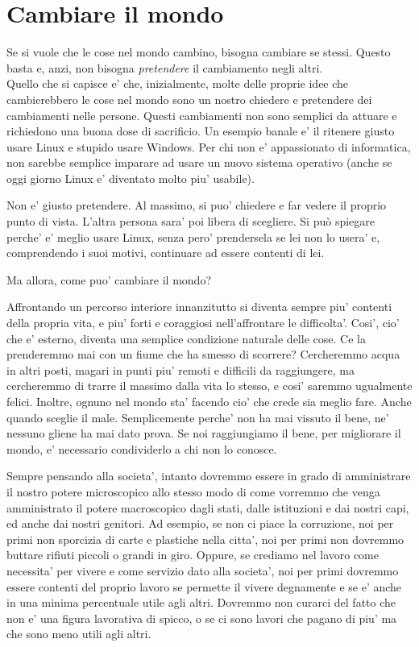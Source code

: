 \chapter{Cambiare il mondo}

Se si vuole che le cose nel mondo cambino, bisogna cambiare se stessi. Questo basta e, anzi, non bisogna \emph{pretendere} il cambiamento negli altri.\\

Quello che si capisce e' che, inizialmente, molte delle proprie idee che cambierebbero le cose nel mondo sono un nostro chiedere e pretendere dei cambiamenti nelle persone. Questi cambiamenti non sono semplici da attuare e richiedono una buona dose di sacrificio. Un esempio banale e' il ritenere giusto usare Linux e stupido usare Windows. Per chi non e' appassionato di informatica, non sarebbe semplice imparare ad usare un nuovo sistema operativo (anche se oggi giorno Linux e' diventato molto piu' usabile).

Non e' giusto pretendere. Al massimo, si puo' chiedere e far vedere il proprio punto di vista. L'altra persona sara' poi libera di scegliere. Si può spiegare perche' e' meglio usare Linux, senza pero' prendersela se lei non lo usera' e, comprendendo i suoi motivi, continuare ad essere contenti di lei.

Ma allora, come puo' cambiare il mondo?

Affrontando un percorso interiore innanzitutto si diventa sempre piu' contenti della propria vita, e piu' forti e coraggiosi nell'affrontare le difficolta'. Cosi', cio' che e' esterno, diventa una semplice condizione naturale delle cose. Ce la prenderemmo mai con un fiume che ha smesso di scorrere? Cercheremmo acqua in altri posti, magari in punti piu' remoti e difficili da raggiungere, ma cercheremmo di trarre il massimo dalla vita lo stesso, e cosi' saremmo ugualmente felici. 
Inoltre, ognuno nel mondo sta' facendo cio' che crede sia meglio fare. Anche quando sceglie il male. Semplicemente perche' non ha mai vissuto il bene, ne' nessuno gliene ha mai dato prova. 
Se noi raggiungiamo il bene, per migliorare il mondo, e' necessario condividerlo a chi non lo conosce.

Sempre pensando alla societa', intanto dovremmo essere in grado di amministrare il nostro potere microscopico allo stesso modo di come vorremmo che venga amministrato il potere macroscopico dagli stati, dalle istituzioni e dai nostri capi, ed anche dai nostri genitori.
Ad esempio, se non ci piace la corruzione, noi per primi non sporcizia di carte e plastiche nella citta', noi per primi non dovremmo buttare rifiuti piccoli o grandi in giro. Oppure, se crediamo nel lavoro come necessita' per vivere e come servizio dato alla societa', noi per primi dovremmo essere contenti del proprio lavoro se permette il vivere degnamente e se e' anche in una minima percentuale utile agli altri. Dovremmo non curarci del fatto che non e' una figura lavorativa di spicco, o se ci sono lavori che pagano di piu' ma che sono meno utili agli altri.

